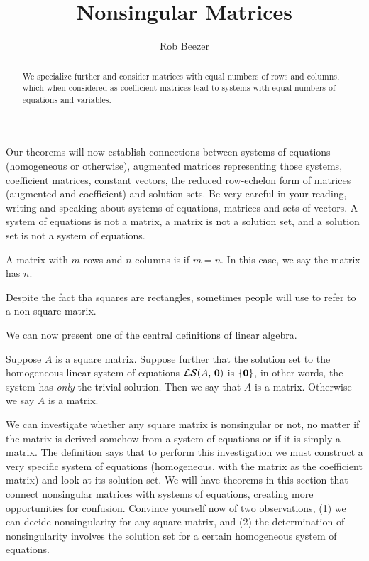 \documentclass{ximera}
\author{Rob Beezer}
\title{Nonsingular Matrices}
\begin{document}
\begin{abstract}
  We specialize further and consider matrices with equal numbers of
  rows and columns, which when considered as coefficient matrices lead
  to systems with equal numbers of equations and variables.
\end{abstract}
\maketitle

Our theorems will now establish connections between systems of
equations (homogeneous or otherwise), augmented matrices representing
those systems, coefficient matrices, constant vectors, the reduced
row-echelon form of matrices (augmented and coefficient) and solution
sets.  Be very careful in your reading, writing and speaking about
systems of equations, matrices and sets of vectors.  A system of
equations is not a matrix, a matrix is not a solution set, and a
solution set is not a system of equations.

\begin{definition}
  A matrix with $m$ rows and $n$ columns is  if $m=n$.  In
  this case, we say the matrix has  $n$.
\end{definition}

\begin{warning}
  Despite the fact tha squares are rectangles, sometimes people will
  use  to refer to a non-square matrix.
\end{warning}

We can now present one of the central definitions of linear algebra.

\begin{definition}
  Suppose $A$ is a square matrix.  Suppose further that the solution
  set to the homogeneous linear system of equations
  $\mathcal{LS}\!\left(A,\,\mathbf{0}\right)$ is $\left\{\mathbf{0}\right\}$, in other
  words, the system has \textit{only} the trivial solution.  Then we
  say that $A$ is a  matrix.  Otherwise we say $A$ is
  a  matrix.
\end{definition}

We can investigate whether any square matrix is nonsingular or not, no
matter if the matrix is derived somehow from a system of equations or
if it is simply a matrix.  The definition says that to perform this
investigation we must construct a very specific system of equations
(homogeneous, with the matrix as the coefficient matrix) and look at
its solution set.  We will have theorems in this section that connect
nonsingular matrices with systems of equations, creating more
opportunities for confusion.  Convince yourself now of two
observations, (1) we can decide nonsingularity for any square matrix,
and (2) the determination of nonsingularity involves the solution set
for a certain homogeneous system of equations.
\end{document}
